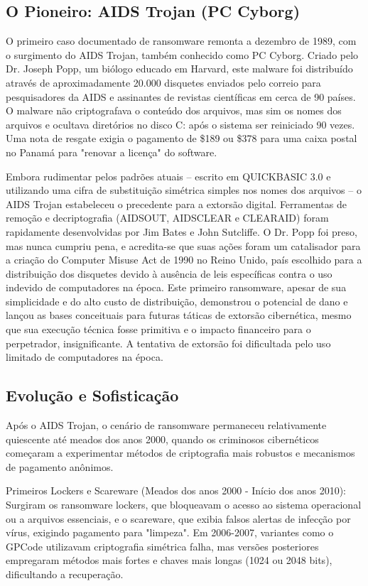 \subsection{O Pioneiro: AIDS Trojan (PC Cyborg)}
O primeiro caso documentado de ransomware remonta a dezembro de 1989, com o surgimento do AIDS Trojan, 
também conhecido como PC Cyborg. Criado pelo Dr. Joseph Popp, um biólogo educado em Harvard, este malware foi distribuído 
através de aproximadamente 20.000 disquetes enviados pelo correio para pesquisadores da AIDS e assinantes de revistas científicas 
em cerca de 90 países. O malware não criptografava o conteúdo dos arquivos, mas sim os nomes dos arquivos e ocultava diretórios no 
disco C: após o sistema ser reiniciado 90 vezes. Uma nota de resgate exigia o pagamento de \$189 ou \$378 para uma caixa postal no 
Panamá para "renovar a licença" do software. 

Embora rudimentar pelos padrões atuais – escrito em QUICKBASIC 3.0 e utilizando uma cifra de substituição simétrica 
simples nos nomes dos arquivos – o AIDS Trojan estabeleceu o precedente para a extorsão digital. Ferramentas de remoção e 
decriptografia (AIDSOUT, AIDSCLEAR e CLEARAID) foram rapidamente desenvolvidas por Jim Bates e John Sutcliffe. 
O Dr. Popp foi preso, mas nunca cumpriu pena, e acredita-se que suas ações foram um catalisador para a criação do 
Computer Misuse Act de 1990 no Reino Unido, país escolhido para a distribuição dos disquetes devido à ausência de leis específicas 
contra o uso indevido de computadores na época. Este primeiro ransomware, apesar de sua simplicidade e do alto custo de distribuição, 
demonstrou o potencial de dano e lançou as bases conceituais para futuras táticas de extorsão cibernética, mesmo que sua 
execução técnica fosse primitiva e o impacto financeiro para o perpetrador, insignificante. 
A tentativa de extorsão foi dificultada pelo uso limitado de computadores na época.


\subsection{Evolução e Sofisticação}

Após o AIDS Trojan, o cenário de ransomware permaneceu relativamente quiescente até meados dos anos 2000, quando os criminosos 
cibernéticos começaram a experimentar métodos de criptografia mais robustos e mecanismos de pagamento anônimos.

Primeiros Lockers e Scareware (Meados dos anos 2000 - Início dos anos 2010): Surgiram os ransomware lockers, 
que bloqueavam o acesso ao sistema operacional ou a arquivos essenciais, e o scareware, que exibia falsos alertas de infecção por 
vírus, exigindo pagamento para "limpeza". Em 2006-2007, variantes como o GPCode utilizavam criptografia simétrica falha, 
mas versões posteriores empregaram métodos mais fortes e chaves mais longas (1024 ou 2048 bits), dificultando a recuperação.

